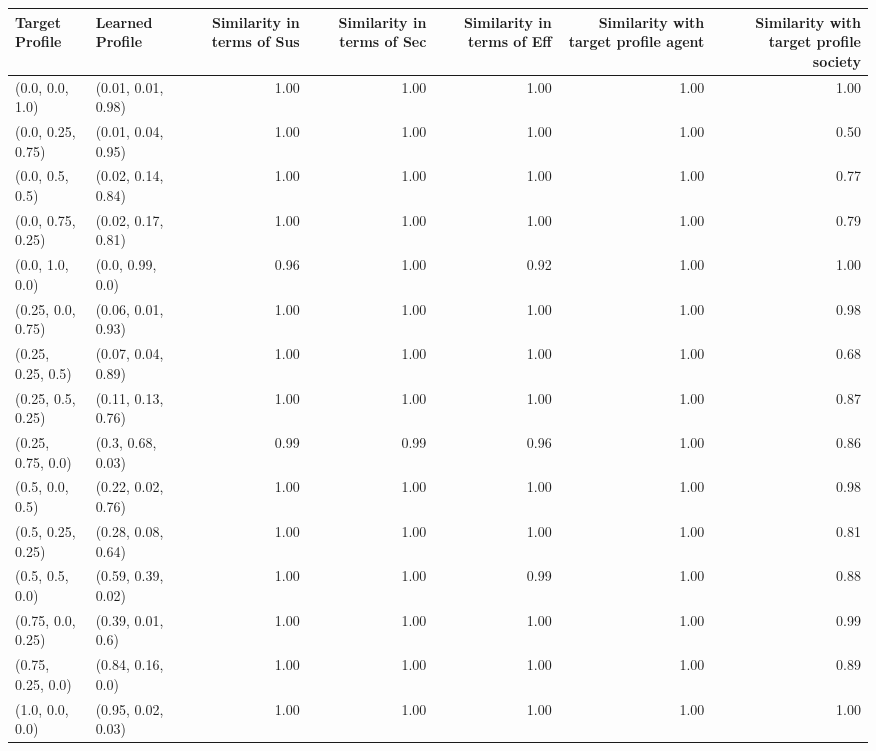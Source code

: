 \begin{tabular}{llrrrrr}
\toprule
Target Profile & Learned Profile & Similarity in terms of Sus & Similarity in terms of Sec & Similarity in terms of Eff & Similarity with target profile agent & Similarity with target profile society \\
\midrule
(0.0, 0.0, 1.0) & (0.01, 0.01, 0.98) & 1.00 & 1.00 & 1.00 & 1.00 & 1.00 \\
(0.0, 0.25, 0.75) & (0.01, 0.04, 0.95) & 1.00 & 1.00 & 1.00 & 1.00 & 0.50 \\
(0.0, 0.5, 0.5) & (0.02, 0.14, 0.84) & 1.00 & 1.00 & 1.00 & 1.00 & 0.77 \\
(0.0, 0.75, 0.25) & (0.02, 0.17, 0.81) & 1.00 & 1.00 & 1.00 & 1.00 & 0.79 \\
(0.0, 1.0, 0.0) & (0.0, 0.99, 0.0) & 0.96 & 1.00 & 0.92 & 1.00 & 1.00 \\
(0.25, 0.0, 0.75) & (0.06, 0.01, 0.93) & 1.00 & 1.00 & 1.00 & 1.00 & 0.98 \\
(0.25, 0.25, 0.5) & (0.07, 0.04, 0.89) & 1.00 & 1.00 & 1.00 & 1.00 & 0.68 \\
(0.25, 0.5, 0.25) & (0.11, 0.13, 0.76) & 1.00 & 1.00 & 1.00 & 1.00 & 0.87 \\
(0.25, 0.75, 0.0) & (0.3, 0.68, 0.03) & 0.99 & 0.99 & 0.96 & 1.00 & 0.86 \\
(0.5, 0.0, 0.5) & (0.22, 0.02, 0.76) & 1.00 & 1.00 & 1.00 & 1.00 & 0.98 \\
(0.5, 0.25, 0.25) & (0.28, 0.08, 0.64) & 1.00 & 1.00 & 1.00 & 1.00 & 0.81 \\
(0.5, 0.5, 0.0) & (0.59, 0.39, 0.02) & 1.00 & 1.00 & 0.99 & 1.00 & 0.88 \\
(0.75, 0.0, 0.25) & (0.39, 0.01, 0.6) & 1.00 & 1.00 & 1.00 & 1.00 & 0.99 \\
(0.75, 0.25, 0.0) & (0.84, 0.16, 0.0) & 1.00 & 1.00 & 1.00 & 1.00 & 0.89 \\
(1.0, 0.0, 0.0) & (0.95, 0.02, 0.03) & 1.00 & 1.00 & 1.00 & 1.00 & 1.00 \\
\bottomrule
\end{tabular}
